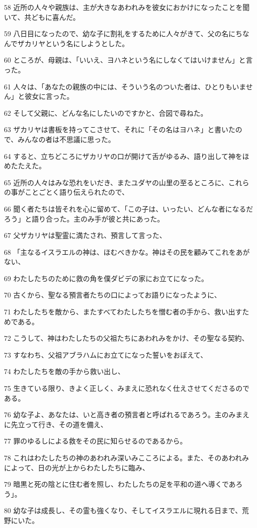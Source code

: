 \par 58 近所の人々や親族は、主が大きなあわれみを彼女におかけになったことを聞いて、共どもに喜んだ。
\par 59 八日目になったので、幼な子に割礼をするために人々がきて、父の名にちなんでザカリヤという名にしようとした。
\par 60 ところが、母親は、「いいえ、ヨハネという名にしなくてはいけません」と言った。
\par 61 人々は、「あなたの親族の中には、そういう名のついた者は、ひとりもいません」と彼女に言った。
\par 62 そして父親に、どんな名にしたいのですかと、合図で尋ねた。
\par 63 ザカリヤは書板を持ってこさせて、それに「その名はヨハネ」と書いたので、みんなの者は不思議に思った。
\par 64 すると、立ちどころにザカリヤの口が開けて舌がゆるみ、語り出して神をほめたたえた。
\par 65 近所の人々はみな恐れをいだき、またユダヤの山里の至るところに、これらの事がことごとく語り伝えられたので、
\par 66 聞く者たちは皆それを心に留めて、「この子は、いったい、どんな者になるだろう」と語り合った。主のみ手が彼と共にあった。
\par 67 父ザカリヤは聖霊に満たされ、預言して言った、
\par 68 「主なるイスラエルの神は、ほむべきかな。神はその民を顧みてこれをあがない、
\par 69 わたしたちのために救の角を僕ダビデの家にお立てになった。
\par 70 古くから、聖なる預言者たちの口によってお語りになったように、
\par 71 わたしたちを敵から、またすべてわたしたちを憎む者の手から、救い出すためである。
\par 72 こうして、神はわたしたちの父祖たちにあわれみをかけ、その聖なる契約、
\par 73 すなわち、父祖アブラハムにお立てになった誓いをおぼえて、
\par 74 わたしたちを敵の手から救い出し、
\par 75 生きている限り、きよく正しく、みまえに恐れなく仕えさせてくださるのである。
\par 76 幼な子よ、あなたは、いと高き者の預言者と呼ばれるであろう。主のみまえに先立って行き、その道を備え、
\par 77 罪のゆるしによる救をその民に知らせるのであるから。
\par 78 これはわたしたちの神のあわれみ深いみこころによる。また、そのあわれみによって、日の光が上からわたしたちに臨み、
\par 79 暗黒と死の陰とに住む者を照し、わたしたちの足を平和の道へ導くであろう」。
\par 80 幼な子は成長し、その霊も強くなり、そしてイスラエルに現れる日まで、荒野にいた。

